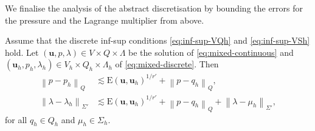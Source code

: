 \documentclass[onefignum,onetabnum]{siamart190516}
\newcommand{\bu}{\boldsymbol{u}}
\newcommand{\bE}{\mathrm{E}}
\newcommand{\nrm}[1]{\left\lVert#1\right\rVert}
\begin{document}
	We finalise the analysis of the abstract discretisation by bounding the errors for the pressure and the Lagrange multiplier from above.
	
	\begin{lemma}\label{lemma:error-ps}
		Assume that the discrete inf-sup conditions \eqref{eq:inf-sup-VQh} and \eqref{eq:inf-sup-VSh} hold. Let $(\bu,p,\lambda)\in V\times Q\times \Lambda$ be the solution of \eqref{eq:mixed-continuous} and $(\bu_h,p_h,\lambda_h)\in V_h\times Q_h\times \Lambda_h$ of \eqref{eq:mixed-discrete}. Then
		\begin{align}
			\nrm{p - p_h}_Q &\lesssim\bE(\bu,\bu_h)^{1/r'} + \nrm{p - q_h}_Q, \label{eq:error-Q}\\
			\nrm{\lambda - \lambda_h}_{\Sigma'} &\lesssim \bE(\bu,\bu_h)^{1/r'} + \nrm{p - q_h}_Q + \nrm{\lambda - \mu_h}_{\Sigma'}, \label{eq:error-S}
		\end{align}
		for all $q_h\in Q_h$ and $\mu_h\in\Sigma_h$.
	\end{lemma}
	
\end{document}
